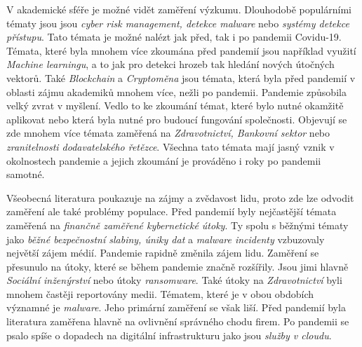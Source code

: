 V akademické sféře je možné vidět zaměření výzkumu.
Dlouhodobě populárními tématy jsou jsou \textit{cyber risk management, detekce malware} nebo \textit{systémy detekce přístupu}.\cite{KUMAR2022102821}
Tato témata je možné nalézt jak před, tak i po pandemii Covidu-19.
Témata, které byla mnohem více zkoumána před pandemií jsou například využití \textit{Machine learningu}, a to jak pro detekci hrozeb tak hledání nových útočných vektorů.
Také \textit{Blockchain} a \textit{Cryptoměna} jsou témata, která byla před pandemií v oblasti zájmu akademiků mnohem více, nežli po pandemii.\cite{KUMAR2022102821}
Pandemie způsobila velký zvrat v myšlení.
Vedlo to ke zkoumání témat, které bylo nutné okamžitě aplikovat nebo která byla nutné pro budoucí fungování společnosti.
Objevují se zde mnohem více témata zaměřená na \textit{Zdravotnictví, Bankovní sektor} nebo \textit{zranitelnosti dodavatelského řetězce}.\cite{KUMAR2022102821}
Všechna tato témata mají jasný vznik v okolnostech pandemie a jejich zkoumání je prováděno i roky po pandemii samotné.

Všeobecná literatura poukazuje na zájmy a zvědavost lidu, proto zde lze odvodit zaměření ale také problémy populace.
Před pandemií byly nejčastější témata zaměřená na \textit{finančně zaměřené kybernetické útoky}.
Ty spolu s běžnými tématy jako \textit{běžné bezpečnostní slabiny, úniky dat} a \textit{malware incidenty} vzbuzovaly největší zájem médií.\cite{KUMAR2022102821}
Pandemie rapidně změnila zájem lidu.
Zaměření se přesunulo na útoky, které se během pandemie značně rozšířily.
Jsou jimi hlavně \textit{Sociální inženýrství} nebo útoky \textit{ransomware}.
Také útoky na \textit{Zdravotnictví} byli mnohem častěji reportovány medii.
Tématem, které je v obou obdobích významné je \textit{malware}.
Jeho primární zaměření se však liší.
Před pandemií byla literatura zaměřena hlavně na ovlivnění správného chodu firem.
Po pandemii se psalo spíše o dopadech na digitální infrastrukturu jako jsou \textit{služby v cloudu}.

